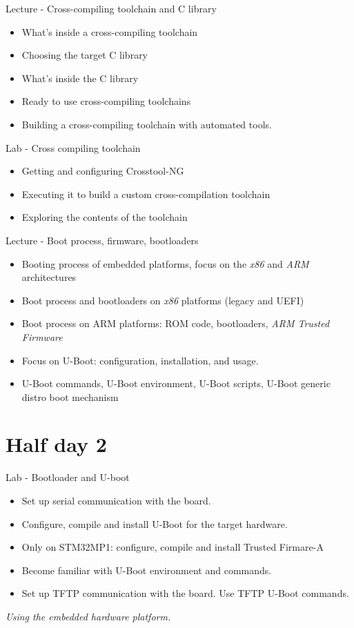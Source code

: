 \documentclass[a4paper,12pt,obeyspaces,spaces,hyphens]{article}
\begin{document}
\feagendatwocolumn
{Lecture - Cross-compiling toolchain and C library}
{
  \begin{itemize}
  \item What's inside a cross-compiling toolchain
  \item Choosing the target C library
  \item What's inside the C library
  \item Ready to use cross-compiling toolchains
  \item Building a cross-compiling toolchain with automated tools.
  \end{itemize}
}
{Lab - Cross compiling toolchain}
{
  \begin{itemize}
  \item Getting and configuring Crosstool-NG
  \item Executing it to build a custom cross-compilation toolchain
  \item Exploring the contents of the toolchain
  \end{itemize}
}

\feagendaonecolumn
{Lecture - Boot process, firmware, bootloaders}
{
  \begin{itemize}
  \item Booting process of embedded platforms, focus on the {\em x86}
    and {\em ARM} architectures
  \item Boot process and bootloaders on {\em x86} platforms (legacy
    and UEFI)
  \item Boot process on ARM platforms: ROM code, bootloaders, {\em ARM
      Trusted Firmware}
  \item Focus on U-Boot: configuration, installation, and usage.
  \item U-Boot commands, U-Boot environment, U-Boot scripts, U-Boot
    generic distro boot mechanism
  \end{itemize}
}

\section{Half day 2}

\feagendaonecolumn
{Lab - Bootloader and U-boot}
{
  \begin{itemize}
  \item Set up serial communication with the board.
  \item Configure, compile and install U-Boot for the target hardware.
  \item Only on STM32MP1: configure, compile and install Trusted Firmare-A
  \item Become familiar with U-Boot environment and commands.
  \item Set up TFTP communication with the board. Use TFTP U-Boot
    commands.
  \end{itemize}

  \vspace{0.5cm}
  {\em Using the embedded hardware platform.}
}
\end{document}
